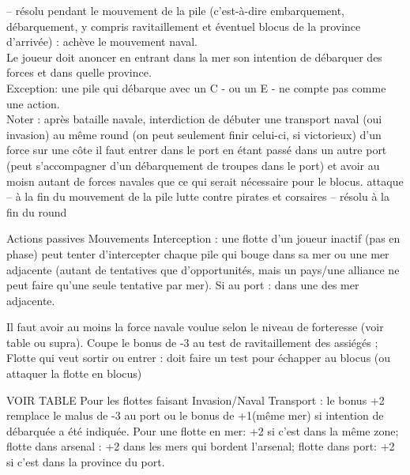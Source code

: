 
\bparag[Exploration] -- résolu pendant le mouvement de la pile
(c'est-à-dire embarquement, débarquement, y compris ravitaillement et
éventuel blocus de la province d'arrivée) : achève le mouvement naval. \\
Le joueur doit anoncer en entrant dans la mer son intention de débarquer
des forces et dans quelle province. \\
Exception: une pile qui débarque avec un C - ou un E - ne compte pas comme une action. \\
Noter : après bataille navale, interdiction de débuter une transport naval (oui invasion) au
même round (on peut seulement finir celui-ci, si victorieux)
 d'un force sur une côte
  il faut entrer dans le port en étant passé
dans un autre port (peut s'accompagner d'un débarquement de
troupes dans le port) et avoir au moisn autant de forces navales que ce qui serait
nécessaire pour le blocus.
\bparag attaque -- à la fin du mouvement de la pile
\bparag lutte contre pirates et corsaires -- résolu à la fin du round

\aparag Actions passives
\bparag Mouvements
\bparag Interception : une flotte d'un joueur inactif (pas en phase)
peut tenter d'intercepter chaque pile qui bouge dans sa mer ou une mer
adjacente (autant de tentatives que d'opportunités, mais un pays/une
alliance ne peut faire qu'une seule tentative par mer).
Si au port : dans une des mer adjacente.

\aparag[Blocus]
Il faut avoir au moins la force navale voulue selon le niveau de forteresse (voir table ou supra).
\bparag Coupe le bonus de -3 au test de ravitaillement des assiégés ;
\bparag Flotte qui veut sortir ou entrer : doit faire un test pour échapper au blocus
(ou attaquer la flotte en blocus)

 VOIR TABLE
\interceptiona
\bparag Pour les flottes faisant Invasion/Naval Transport : le bonus +2 remplace
le malus de -3 au port ou le bonus de +1(même mer) si intention de
débarquée a été indiquée. Pour une flotte en mer: +2 si c'est dans la
même zone; flotte dans arsenal : +2 dans les mers qui bordent l'arsenal;
flotte dans port: +2 si c'est dans la province du port.

%


